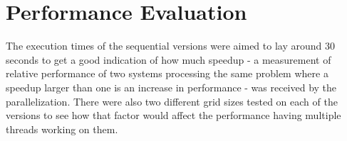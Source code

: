 \documentclass{article}
\begin{document}
\section{Performance Evaluation}\label{performanceevaluation}


The execution times of the sequential versions were aimed to lay around 30 seconds to get a good indication of how much speedup - a measurement of relative performance of two systems processing the same problem where a speedup larger than one is an increase in performance - was received by the parallelization. There were also two different grid sizes tested on each of the versions to see how that factor would affect the performance having multiple threads working on them. 

\begin{table}
\centering
{}
\caption{Sequential Jacobi test results}
    \label{fig:jacobi}
\end{table}
\end{document}
